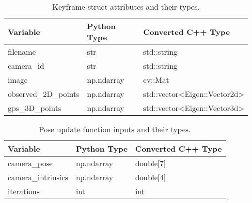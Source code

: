 \begin{table}[h]
    \centering
    \caption{Keyframe struct attributes and their types.}
    \begin{tabular}{p{35mm} p{25mm} p{45mm}}
        \toprule
        \textbf{Variable} & \textbf{Python Type} & \textbf{Converted C++ Type} \\
        \midrule
        filename & str & std::string \\
        camera\_id & str & std::string \\
        image & np.ndarray & cv::Mat \\
        observed\_2D\_points & np.ndarray & std::vector\textless Eigen::Vector2d\textgreater \\
        gps\_3D\_points & np.ndarray & std::vector\textless Eigen::Vector3d\textgreater \\
        \bottomrule
    \end{tabular}
    \label{tab:keyframe_struct}
\end{table}

\begin{table}[h]
    \centering
    \caption{Pose update function inputs and their types.}
    \begin{tabular}{p{35mm} p{25mm} p{45mm}}
        \toprule
        \textbf{Variable} & \textbf{Python Type} & \textbf{Converted C++ Type} \\
        \midrule
        camera\_pose & np.ndarray & double[7] \\
        camera\_intrinsics & np.ndarray & double[4] \\
        iterations & int & int \\
        \bottomrule
    \end{tabular}
    \label{tab:update_camera_pose}
\end{table}